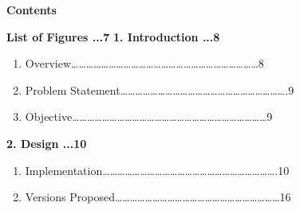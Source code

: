 \documentclass[10pt]{article} %
\begin{document}
\noindent \textbf{}
\begin{Center}
\noindent \textbf{\Large Contents}

\end{Center}
\noindent \textbf{}

\noindent \textbf{}

\noindent \textbf{List of Figures                                             \hspace{110mm}...7}\newline
\noindent \textbf{1. Introduction                                             \hspace{109mm}...8}
\item \begin{enumerate}
\item \textbf{ }Overview{\dots}{\dots}{\dots}{\dots}{\dots}{\dots}{\dots}{\dots}{\dots}{\dots}{\dots}{\dots}{\dots}{\dots}{\dots}{\dots}{\dots}{\dots}{\dots}{\dots}{\dots}{\dots}{\dots}{\dots}{\dots}8

\item  Problem Statement{\dots}{\dots}{\dots}{\dots}{\dots}{\dots}{\dots}{\dots}{\dots}{\dots}{\dots}{\dots}{\dots}{\dots}{\dots}{\dots}{\dots}{\dots}{\dots}{\dots}{\dots}{\dots}.9

\item Objective{\dots}{\dots}{\dots}{\dots}{\dots}{\dots}{\dots}{\dots}{\dots}{\dots}{\dots}{\dots}{\dots}{\dots}{\dots}{\dots}{\dots}{\dots}{\dots}{\dots}{\dots}{\dots}{\dots}{\dots}{\dots}{\dots}9\textbf{}
\end{enumerate}


\noindent \textbf{}

\item \textbf{ 2. Design                                                  \hspace{115mm}...10}

\begin{enumerate}
\item \textbf{ }Implementation{\dots}{\dots}{\dots}{\dots}{\dots}{\dots}{\dots}{\dots}{\dots}{\dots}{\dots}{\dots}{\dots}{\dots}{\dots}{\dots}{\dots}{\dots}{\dots}{\dots}{\dots}{\dots}{\dots}.10

\item  Versions Proposed{\dots}{\dots}{\dots}{\dots}{\dots}{\dots}{\dots}{\dots}{\dots}{\dots}{\dots}{\dots}{\dots}{\dots}{\dots}{\dots}{\dots}{\dots}{\dots}{\dots}{\dots}{\dots}16
\end{enumerate}


\noindent 
\end{document}
